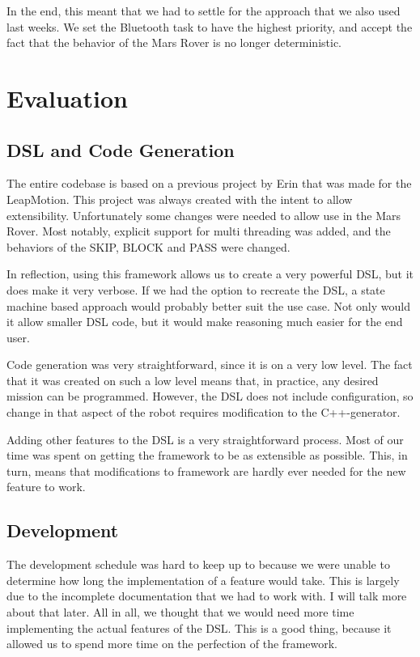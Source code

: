 \documentclass{scrartcl}
\begin{document}
In the end, this meant that we had to settle for the approach that we also used last weeks.
We set the Bluetooth task to have the highest priority, and accept the fact that the behavior of the Mars Rover is no longer deterministic.

\section{Evaluation}
\subsection{DSL and Code Generation}
The entire codebase is based on a previous project by Erin that was made for the LeapMotion.
This project was always created with the intent to allow extensibility.
Unfortunately some changes were needed to allow use in the Mars Rover.
Most notably, explicit support for multi threading was added, and the behaviors of the SKIP, BLOCK and PASS were changed.

In reflection, using this framework allows us to create a very powerful DSL, but it does make it very verbose.
If we had the option to recreate the DSL, a state machine based approach would probably better suit the use case.
Not only would it allow smaller DSL code, but it would make reasoning much easier for the end user.

Code generation was very straightforward, since it is on a very low level.
The fact that it was created on such a low level means that, in practice, any desired mission can be programmed.
However, the DSL does not include configuration, so change in that aspect of the robot requires modification to the C++-generator.

Adding other features to the DSL is a very straightforward process.
Most of our time was spent on getting the framework to be as extensible as possible.
This, in turn, means that modifications to framework are hardly ever needed for the new feature to work.

\subsection{Development}
The development schedule was hard to keep up to because we were unable to determine how long the implementation of a feature would take.
This is largely due to the incomplete documentation that we had to work with.
I will talk more about that later.
All in all, we thought that we would need more time implementing the actual features of the DSL.
This is a good thing, because it allowed us to spend more time on the perfection of the framework.
\end{document}
